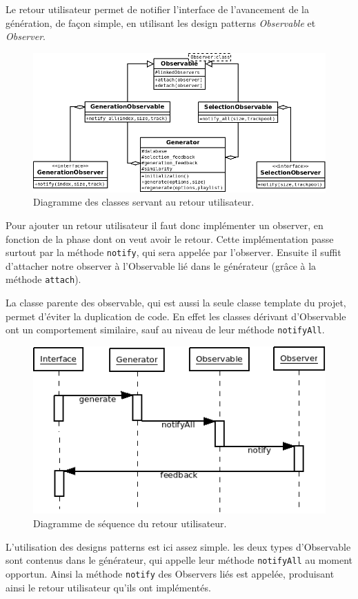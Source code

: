 Le retour utilisateur permet de notifier l'interface de l’avancement de la génération, de façon simple, en utilisant les design patterns \emph{Observable}
et \emph{Observer}.

\begin{figure}[H]
\includegraphics[width=\textwidth]{data/archi/feedback.png}
\caption{Diagramme des classes servant au retour utilisateur.}
\end{figure}

Pour ajouter un retour utilisateur il faut donc implémenter un observer, en
fonction de la phase dont on veut avoir le retour. Cette implémentation passe
surtout par la méthode \texttt{notify}, qui sera appelée par l'observer.
Ensuite il suffit d'attacher notre observer à l'Observable lié dans le
générateur (grâce à la méthode \texttt{attach}).

La classe parente des observable, qui est aussi la seule classe template du
projet, permet d'éviter la duplication de code. En effet les classes dérivant
d'Observable ont un comportement similaire, sauf au niveau de leur méthode
\texttt{notifyAll}.

\begin{figure}[H]
\includegraphics[width=\textwidth]{data/archi/feedback_sequence.png}
\caption{Diagramme de séquence du retour utilisateur.}
\end{figure}

L'utilisation des designs patterns est ici assez simple. les deux types
d'Observable sont contenus dans le générateur, qui appelle leur méthode
\texttt{notifyAll} au moment opportun. Ainsi la méthode \texttt{notify} des 
Observers liés est appelée, produisant ainsi le retour utilisateur qu'ils ont
implémentés.
